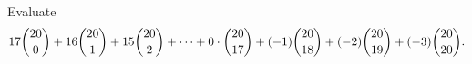 Evaluate
\[17\dbinom{20}{0}+16\dbinom{20}{1}+15\dbinom{20}{2}+\cdots+0\cdot\dbinom{20}{17}+(-1)\dbinom{20}{18}+(-2)\dbinom{20}{19}+(-3)\dbinom{20}{20}.\]
